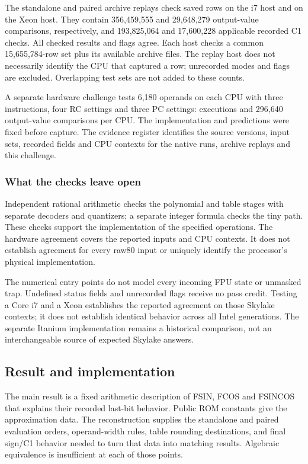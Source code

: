 \documentclass[11pt]{article}
\begin{document}
The standalone and paired archive replays check \TrigIsevenRows{} saved
rows on the i7 host and \TrigXeonRows{} on the Xeon host. They contain
356,459,555 and 29,648,279 output-value comparisons, respectively, and
193,825,064 and 17,600,228 applicable recorded C1 checks. All checked
results and flags agree. Each host checks a common 15,655,784-row set
plus its available archive files. The replay host does not necessarily
identify the CPU that captured a row; unrecorded modes and flags are
excluded. Overlapping test sets are not added to these counts.

A separate hardware challenge tests 6,180 operands on each CPU with three
instructions, four RC settings and three PC settings: \TrigChallengeRows{}
executions and 296,640 output-value comparisons per CPU. The implementation
and predictions were fixed before capture. The evidence register identifies
the source versions, input sets, recorded fields and CPU contexts for the
native runs, archive replays and this challenge.

\subsubsection{What the checks leave open}

Independent rational arithmetic checks the polynomial and table stages with
separate decoders and quantizers; a separate integer formula checks the tiny
path. These checks support the implementation of the specified operations.
The hardware agreement covers the reported inputs and CPU contexts. It does
not establish agreement for every raw80 input or uniquely identify the
processor's physical implementation.

The numerical entry points do not model every incoming FPU state or unmasked
trap. Undefined status fields and unrecorded flags receive no pass credit.
Testing a Core i7 and a Xeon establishes the reported agreement on those
Skylake contexts; it does not establish identical behavior across all Intel
generations. The separate Itanium implementation remains a historical
comparison, not an interchangeable source of expected Skylake answers.

\subsection{Result and implementation}

The main result is a fixed arithmetic description of FSIN, FCOS and FSINCOS
that explains their recorded last-bit behavior. Public ROM constants give
the approximation data. The reconstruction supplies the standalone and
paired evaluation orders, operand-width rules, table rounding destinations,
and final sign/C1 behavior needed to turn that data into matching results.
Algebraic equivalence is insufficient at each of those points.
\end{document}
